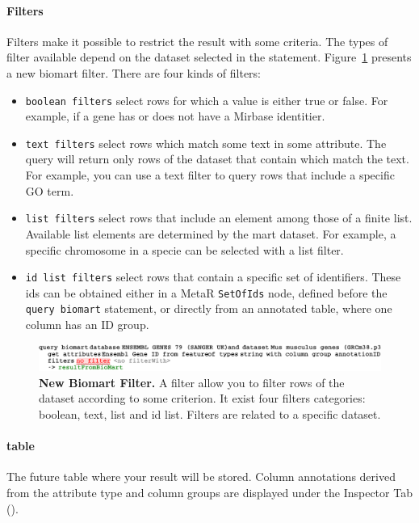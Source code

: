 \paragraph{Filters}
Filters make it possible to restrict the result with some criteria. The types of filter available depend on the dataset selected in the statement. Figure~\ref{fig:BiomartFilter} presents a new biomart filter. There are four kinds of filters: 
\begin{itemize}

\item \texttt{boolean filters} select rows for which a value is either true or false. For example, if a gene has or does not have a Mirbase identitier.
\item \texttt{text filters} select rows which match some text in some attribute. The query will return only rows of the dataset that contain which match the text. For example, you can use a text filter to query rows that include a specific GO term.
\item \texttt{list filters} select rows that include an element among those of a finite list. Available list elements are determined by the mart dataset.  For example, a specific chromosome in a specie can be selected with a list filter.
\item \texttt{id list filters} select rows that contain a specific set of identifiers. These ids can be obtained either in a MetaR \texttt{SetOfIds} node, defined before the \texttt{query biomart} statement, or directly from an annotated table, where one column has an ID group.  

\end{itemize}

 \begin{figure}[h!tbp]
  \centering
  \includegraphics[width=\figWidthWide]{figures/BiomartFilter.pdf}
\caption[New Biomart Filter]{\textbf{New Biomart Filter.} A filter allow you to filter rows of the dataset according to some criterion. It exist four filters categories: boolean, text, list and id list. Filters are related to a specific dataset.}
\label{fig:BiomartFilter}
\end{figure}

\paragraph{table}
The future table where your result will be stored. Column annotations derived from the attribute type and column groups are displayed under the Inspector Tab (\inspectorTabIcon).
